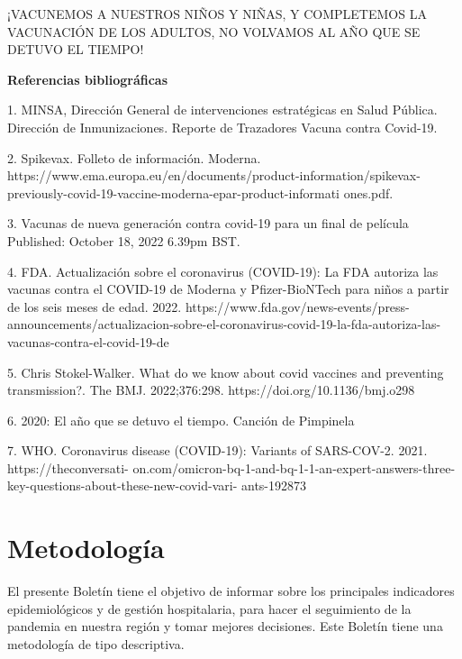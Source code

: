 \documentclass[12pt,a4paper,openany]{book}
\begin{document}
 ¡VACUNEMOS A NUESTROS NIÑOS Y NIÑAS, Y COMPLETEMOS LA VACUNACIÓN DE LOS ADULTOS, NO VOLVAMOS AL AÑO QUE SE DETUVO EL TIEMPO!
 


\textbf{Referencias bibliográficas}

1.	MINSA, Dirección General de intervenciones estratégicas en Salud Pública. Dirección de Inmunizaciones. Reporte de Trazadores Vacuna contra Covid-19. 

2.	Spikevax. Folleto de información. Moderna. https://www.ema.europa.eu/en/documents/product-information/spikevax-previously-covid-19-vaccine-moderna-epar-product-informati
ones.pdf.

3.	Vacunas de nueva generación contra covid-19 para un final de película Published: October 18, 2022 6.39pm BST.

4. FDA. Actualización sobre el coronavirus (COVID-19): La FDA autoriza las vacunas contra el COVID-19 de Moderna y Pfizer-BioNTech para niños a partir de los seis meses de edad. 2022. https://www.fda.gov/news-events/press-announcements/actualizacion-sobre-el-coronavirus-covid-19-la-fda-autoriza-las-vacunas-contra-el-covid-19-de

5. Chris Stokel-Walker. What do we know about covid vaccines and preventing transmission?. The BMJ. 2022;376:298. https://doi.org/10.1136/bmj.o298

6.	2020: El año que se detuvo el tiempo. Canción de Pimpinela

7. WHO. Coronavirus disease (COVID-19): Variants of SARS-COV-2. 2021. https://theconversati-
on.com/omicron-bq-1-and-bq-1-1-an-expert-answers-three-key-questions-about-these-new-covid-vari-
ants-192873



	
		
	
	\clearpage	
	\section*{Metodología}
	
	
	
	\noindent El presente Boletín tiene el objetivo de informar sobre los principales indicadores epidemiológicos y
	de gestión hospitalaria, para hacer el seguimiento de la pandemia en nuestra región y tomar mejores decisiones. Este Boletín tiene una metodología de tipo descriptiva.
	
\end{document}
